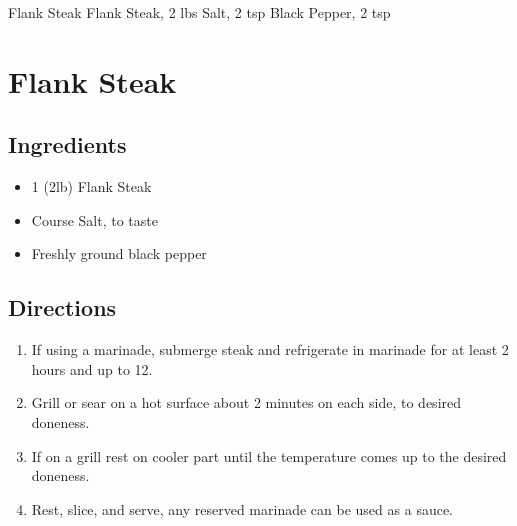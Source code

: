 Flank Steak
  Flank Steak, 2 lbs
  Salt, 2 tsp
  Black Pepper, 2 tsp

\section{ Flank Steak }

\subsection{ Ingredients }

\begin{itemize}
  \item 1 (2lb) Flank Steak
  \item Course Salt, to taste
  \item Freshly ground black pepper
\end{itemize}

\subsection{ Directions }

\begin{enumerate}
  \item If using a marinade, submerge steak and refrigerate in marinade for at least 2 hours and up to 12. 
  \item Grill or sear on a hot surface about 2 minutes on each side, to desired doneness. 
  \item If on a grill rest on cooler part until the temperature comes up to the desired doneness. 
  \item Rest, slice, and serve, any reserved marinade can be used as a sauce. 
\end{enumerate}
